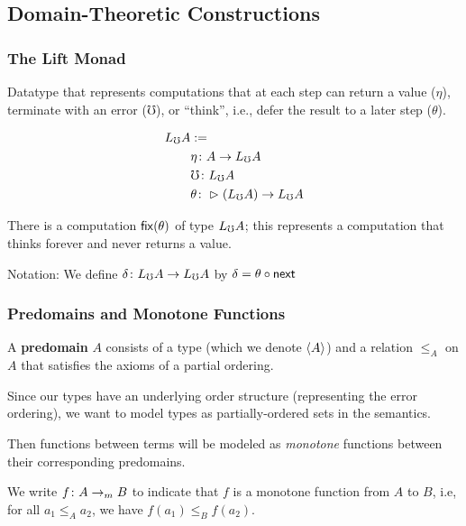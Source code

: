 \documentclass[
	11pt, %
]{beamer}
\begin{document}


\subsection{Domain-Theoretic Constructions}
\frame{\tableofcontents[currentsubsection]}



\begin{frame}
	\frametitle{The Lift Monad}

	Datatype that represents computations that at each step can return a value ($\eta$), terminate with an error ($\mho$), or
	``think'', i.e., defer the result to a later step ($\theta$).

	\begin{definition}
		\begin{align*}
			L_\mho A &:= \\
			&\eta \colon A \to L_\mho A \\
			&\mho \colon L_\mho A \\
			&\theta \colon \vartriangleright (L_\mho A) \to L_\mho A
		\end{align*}
	\end{definition}

	There is a computation $\mathsf{fix}(\theta)$ of type $L_\mho A$; this represents a computation
	that thinks forever and never returns a value.

	\medskip

	Notation: We define $\delta \colon L_\mho A \to L_\mho A$ by $\delta = \theta \circ \mathsf{next}$

	
\end{frame}

\begin{frame}
	\frametitle{Predomains and Monotone Functions}

	A \textbf{predomain} $A$ consists of a type (which we denote $\langle {A} \rangle$) and a relation
	$\le_A$ on $A$ that satisfies the axioms of a partial ordering.

	\smallskip

	Since our types have an underlying order structure (representing the error ordering),
	we want to model types as partially-ordered sets in the semantics.

	\bigskip

	Then functions between terms will be modeled as \emph{monotone} functions between
	their corresponding predomains.

	\smallskip
	
	We write $f \colon A \to_m B$ to indicate that $f$ is a monotone
	function from $A$ to $B$, i.e, for all $a_1 \le_A a_2$, we have $f(a_1) \le_B f(a_2)$.
	
\end{frame}
\end{document}
